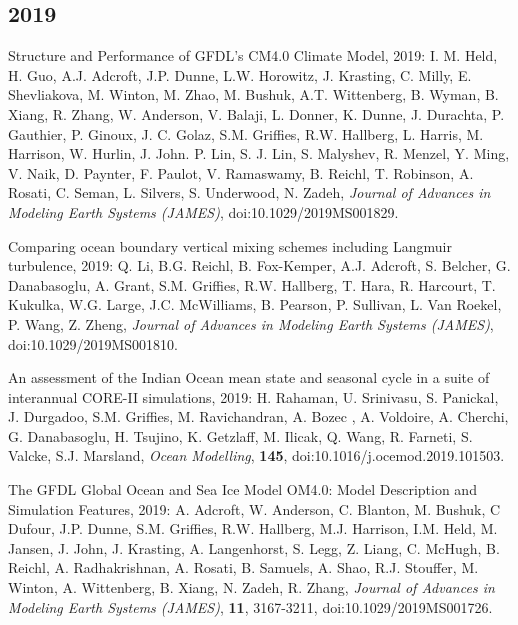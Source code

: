 \begin{etaremune}
\subsection*{\sc \color{Maroon} 2019}

\item Structure and Performance of GFDL's CM4.0 Climate Model, 2019: I. M. Held, H. Guo, A.J. Adcroft, J.P. Dunne, L.W. Horowitz, J. Krasting, C. Milly, E. Shevliakova, M. Winton, M. Zhao, M. Bushuk, A.T. Wittenberg, B. Wyman, B. Xiang, R. Zhang, W. Anderson, V. Balaji, L. Donner, K. Dunne, J. Durachta, P. Gauthier, P. Ginoux, J. C. Golaz, S.M. Griffies, R.W. Hallberg, L.  Harris, M. Harrison, W. Hurlin, J. John. P. Lin, S. J. Lin, S. Malyshev, R. Menzel, Y. Ming, V. Naik, D. Paynter, F. Paulot, V. Ramaswamy, B. Reichl, T. Robinson, A. Rosati, C. Seman, L. Silvers, S. Underwood, N. Zadeh, {\it Journal of Advances in Modeling Earth Systems (JAMES)}, doi:10.1029/2019MS001829.

\item Comparing ocean boundary vertical mixing schemes including Langmuir turbulence, 2019: Q. Li, B.G. Reichl,  B. Fox-Kemper, A.J. Adcroft, S. Belcher, G. Danabasoglu, A. Grant, S.M. Grif\/f\/ies, R.W. Hallberg, T. Hara, R. Harcourt, T. Kukulka, W.G. Large, J.C. McWilliams, B. Pearson, P. Sullivan, L. Van Roekel, P. Wang, Z. Zheng, {\it Journal of Advances in Modeling Earth Systems (JAMES)}, doi:10.1029/2019MS001810.

\item An assessment of the Indian Ocean mean state and seasonal cycle in a suite of interannual CORE-II simulations, 2019: H. Rahaman, U. Srinivasu,  S. Panickal, J. Durgadoo, S.M. Grif\/f\/ies, M. Ravichandran, A. Bozec , A. Voldoire, A. Cherchi, G. Danabasoglu, H. Tsujino, K. Getzlaff, M. Ilicak, Q. Wang, R. Farneti, S. Valcke, S.J. Marsland, {\it Ocean Modelling}, {\bf 145},  
doi:10.1016/j.ocemod.2019.101503.



\item The GFDL Global Ocean and Sea Ice Model OM4.0: Model Description and Simulation Features, 2019: A. Adcroft, W. Anderson, C. Blanton, M. Bushuk, C Dufour, J.P. Dunne, S.M. Grif\/f\/ies, R.W. Hallberg, M.J. Harrison, I.M. Held, M.  Jansen, J. John, J. Krasting, A. Langenhorst, S. Legg, Z. Liang, C. McHugh, B. Reichl, A. Radhakrishnan, A. Rosati, B. Samuels, A. Shao, R.J. Stouffer, M. Winton, A. Wittenberg, B. Xiang, N. Zadeh, R. Zhang, {\it Journal of Advances in Modeling Earth Systems (JAMES)},
{\bf 11}, 3167-3211, doi:10.1029/2019MS001726.


\end{etaremune}

